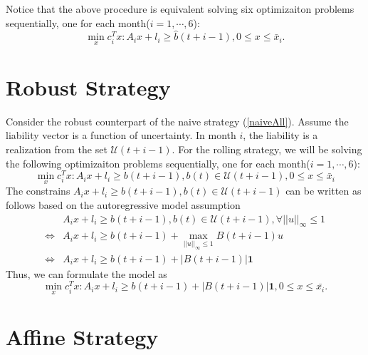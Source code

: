     Notice that the above procedure is equivalent solving six optimizaiton problems sequentially, one for each month($i = 1, \cdots, 6$):
    \begin{equation}\label{naiveAll}
        \min_x c_i^Tx: A_ix+l_i\geq\hat{b}(t+i-1), 0\leq x\leq \bar{x}_i.
    \end{equation}

\section{Robust Strategy}

    Consider the robust counterpart of the naive strategy (\ref{naiveAll}). Assume the liability vector is a function of uncertainty. In month $i$, the liability is a realization from the set $\mathcal{U}(t+i-1)$. For the rolling strategy, we will be solving the following optimizaiton problems sequentially, one for each month($i = 1, \cdots, 6$):
    \begin{equation}\label{eq:robust_apx}
       \min_x c_i^Tx: A_ix+l_i\geq b(t+i-1), b(t)\in\mathcal{U}(t+i-1) ,0\leq x\leq \bar{x}_i
    \end{equation}
    The constrains $A_ix+l_i\geq b(t+i-1), b(t)\in\mathcal{U}(t+i-1)$ can be written as follows based on the autoregressive model assumption
    \[\begin{split}
        & A_ix+l_i\geq b(t+i-1), b(t)\in\mathcal{U}(t+i-1), \forall ||u||_\infty \leq 1 \\
        \iff & A_ix+l_i\geq b(t+i-1) + \max_{||u||_\infty \leq 1}B(t+i-1)u \\
        \iff & A_ix+l_i\geq b(t+i-1) + |B(t+i-1)|\textbf{1}
    \end{split}\]
    Thus, we can formulate the model as
    \begin{equation}\label{eq:robust_final_apx}
        \min_x c_i^Tx: A_ix+l_i\geq b(t+i-1)+|B(t+i-1)|\textbf{1}, 0\leq x\leq \bar{x_i}.
    \end{equation}

\section{Affine Strategy}

